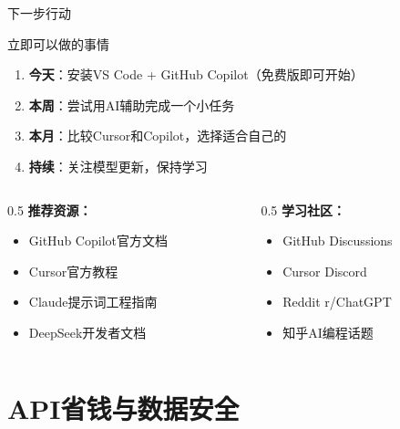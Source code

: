 \documentclass[aspectratio=169,11pt]{beamer}
\begin{document}
\begin{frame}{下一步行动}
    \begin{block}{立即可以做的事情}
        \begin{enumerate}
            \item \textbf{今天}：安装VS Code + GitHub Copilot（免费版即可开始）
            \item \textbf{本周}：尝试用AI辅助完成一个小任务
            \item \textbf{本月}：比较Cursor和Copilot，选择适合自己的
            \item \textbf{持续}：关注模型更新，保持学习
        \end{enumerate}
    \end{block}
    
    \vspace{0.5cm}
    \begin{columns}
        \begin{column}{0.5\textwidth}
            \textbf{推荐资源：}
            \begin{itemize}
                \item GitHub Copilot官方文档
                \item Cursor官方教程
                \item Claude提示词工程指南
                \item DeepSeek开发者文档
            \end{itemize}
        \end{column}
        \begin{column}{0.5\textwidth}
            \textbf{学习社区：}
            \begin{itemize}
                \item GitHub Discussions
                \item Cursor Discord
                \item Reddit r/ChatGPT
                \item 知乎AI编程话题
            \end{itemize}
        \end{column}
    \end{columns}
\end{frame}

\section{API省钱与数据安全}
\end{document}
